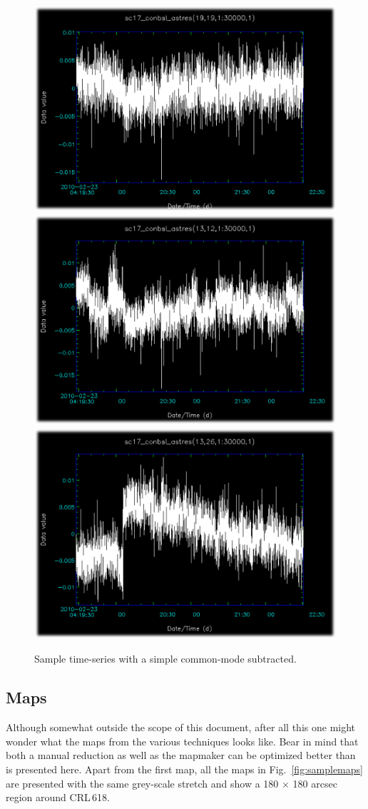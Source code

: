 \documentclass[twoside,11pt]{article}
\newcommand{\xlabel}[1]{}
\renewcommand{\_}{\texttt{\symbol{95}}}
\begin{document}
\begin{figure}
\begin{center}
\includegraphics[width=0.30\linewidth]{sc19_conbsl_astres_19_19}
\hspace{0.03\linewidth}
\includegraphics[width=0.30\linewidth]{sc19_conbsl_astres_13_12}
\hspace{0.03\linewidth}
\includegraphics[width=0.30\linewidth]{sc19_conbsl_astres_13_26}
\caption{Sample time-series with a simple common-mode subtracted.}
\label{fig:sampleastres}
\end{center}
\end{figure}
\subsection{\xlabel{samplemaps}Maps}
\label{sec:samplemaps}

Although somewhat outside the scope of this document, after all this
one might wonder what the maps from the various techniques looks like.
Bear in mind that both a manual reduction as well as the mapmaker can
be optimized better than is presented here. Apart from the first map,
all the maps in Fig.\ \ref{fig:samplemaps} are presented with the same
grey-scale stretch and show a 180 $\times$ 180 arcsec region around
CRL\,618.
\end{document}
